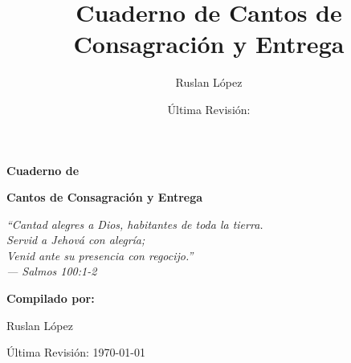 \documentclass[12pt, spanish]{book}
\title{Cuaderno de Cantos de Consagraci\'on y Entrega}
\author{Ruslan L\'opez}
\date{\'Ultima Revisi\'on:  \RevDate}
\newcommand{\RevDate}{\today}
\begin{document}
    \hypersetup{pageanchor=false}

    \begin{titlepage}
        \centering

        \vspace*{1cm}

        {\Huge\bfseries\sffamily{$\dagger$}\par}

        \vspace{1.5cm}

        {\Huge\bfseries\sffamily Cuaderno de\par}
        \vspace{0.5cm}
        {\Huge\bfseries\sffamily Cantos de Consagraci\'on y Entrega\par}

        \vspace{2cm}

        \begin{center}
            \Large\itshape ``Cantad alegres a Dios, habitantes de toda la tierra.\\
            Servid a Jehov\'a con alegr\'ia;\\
            Venid ante su presencia con regocijo.''\\
            \vspace{0.3cm}
            --- Salmos 100:1-2
        \end{center}

        \vspace{2cm}

        {\Large\bfseries Compilado por:\par}
        \vspace{0.5cm}
        {\Large Ruslan L\'opez\par}

        \vfill

        {\large \'Ultima Revisi\'on: \RevDate\par}

        \vspace{1cm}

    \end{titlepage}

    \hypersetup{pageanchor=true}
    \ifWordBk
    \twocolumn
    \fi
\end{document}

